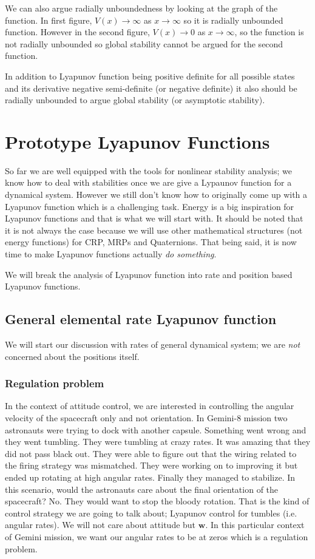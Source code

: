 \documentclass{article}
\begin{document}
We can also argue radially unboundedness by looking at the graph of the function. In first figure, $V(x)\rightarrow\infty$ as $x\rightarrow\infty$ so it is radially unbounded function. However in the second figure, $V(x)\rightarrow 0$ as $x\rightarrow\infty$, so the function is not radially unbounded so global stability cannot be argued for the second function.

In addition to Lyapunov function being positive definite for all possible states and its derivative negative semi-definite (or negative definite) it also should be radially unbounded to argue global stability (or asymptotic stability).

\section{Prototype Lyapunov Functions}
So far we are well equipped with the tools for nonlinear stability analysis; we know how to deal with stabilities once we are give a Lypaunov function for a dynamical system. However we still don't know how to originally come up with a Lyapunov function which is a challenging task. Energy is a big inspiration for Lyapunov functions and that is what we will start with. It should be noted that it is not always the case because we will use other mathematical structures (not energy functions) for CRP, MRPs and Quaternions. That being said, it is now time to make Lyapunov functions actually \textit{do something}.

We will break the analysis of Lyapunov function into rate and position based Lyapunov functions.

\subsection{General elemental rate Lyapunov function}
We will start our discussion with rates of general dynamical system; we are \textit{not} concerned about the positions itself.

\subsubsection{Regulation problem}
In the context of attitude control, we are interested in controlling the angular velocity of the spacecraft only and not orientation. In Gemini-8 mission two astronauts were trying to dock with another capsule. Something went wrong and they went tumbling. They were tumbling at crazy rates. It was amazing that they did not pass black out. They were able to figure out  that the wiring related to the firing strategy was mismatched. They were working on to improving it but ended up rotating at high angular rates. Finally they managed to stabilize. In this scenario, would the astronauts care about the final orientation of the spacecraft? No. They would want to stop the bloody rotation. That is the kind of control strategy we are going to talk about; Lyapunov control for tumbles (i.e. angular rates). We will not care about attitude but $\bm{w}$. In this particular context of Gemini mission, we want our angular rates to be at zeros which is a regulation problem.
\end{document}
